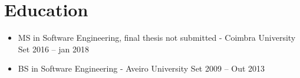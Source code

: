 \documentclass[11pt]{article}       %
\begin{document}

\vspace{-18.5pt}

\section*{Education}
\begin{itemize}
\item MS in Software Engineering, final thesis not submitted - Coimbra University \hfill Set 2016 -- jan 2018 \\
\item BS in Software Engineering - Aveiro University \hfill Set 2009 -- Out 2013
\end{itemize}
\end{document}
